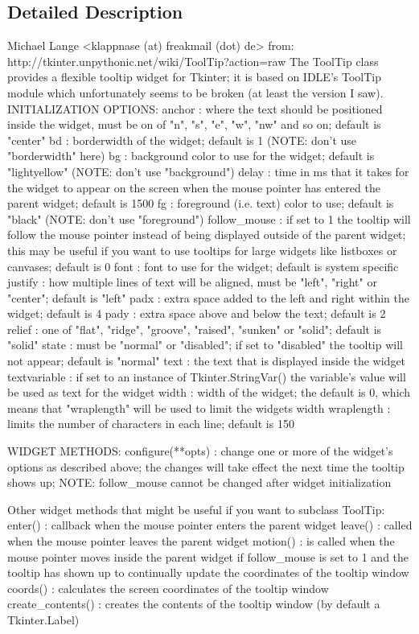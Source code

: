 \subsection{Detailed Description}
\begin{DoxyVerb}Michael Lange <klappnase (at) freakmail (dot) de>
from: http://tkinter.unpythonic.net/wiki/ToolTip?action=raw
The ToolTip class provides a flexible tooltip widget for Tkinter; it is based on IDLE's ToolTip
module which unfortunately seems to be broken (at least the version I saw).
INITIALIZATION OPTIONS:
anchor :        where the text should be positioned inside the widget, must be on of "n", "s", "e", "w", "nw" and so on;
default is "center"
bd :            borderwidth of the widget; default is 1 (NOTE: don't use "borderwidth" here)
bg :            background color to use for the widget; default is "lightyellow" (NOTE: don't use "background")
delay :         time in ms that it takes for the widget to appear on the screen when the mouse pointer has
entered the parent widget; default is 1500
fg :            foreground (i.e. text) color to use; default is "black" (NOTE: don't use "foreground")
follow_mouse :  if set to 1 the tooltip will follow the mouse pointer instead of being displayed
outside of the parent widget; this may be useful if you want to use tooltips for
large widgets like listboxes or canvases; default is 0
font :          font to use for the widget; default is system specific
justify :       how multiple lines of text will be aligned, must be "left", "right" or "center"; default is "left"
padx :          extra space added to the left and right within the widget; default is 4
pady :          extra space above and below the text; default is 2
relief :        one of "flat", "ridge", "groove", "raised", "sunken" or "solid"; default is "solid"
state :         must be "normal" or "disabled"; if set to "disabled" the tooltip will not appear; default is "normal"
text :          the text that is displayed inside the widget
textvariable :  if set to an instance of Tkinter.StringVar() the variable's value will be used as text for the widget
width :         width of the widget; the default is 0, which means that "wraplength" will be used to limit the widgets width
wraplength :    limits the number of characters in each line; default is 150

WIDGET METHODS:
configure(**opts) : change one or more of the widget's options as described above; the changes will take effect the
    next time the tooltip shows up; NOTE: follow_mouse cannot be changed after widget initialization

Other widget methods that might be useful if you want to subclass ToolTip:
enter() :           callback when the mouse pointer enters the parent widget
leave() :           called when the mouse pointer leaves the parent widget
motion() :          is called when the mouse pointer moves inside the parent widget if follow_mouse is set to 1 and the
    tooltip has shown up to continually update the coordinates of the tooltip window
coords() :          calculates the screen coordinates of the tooltip window
create_contents() : creates the contents of the tooltip window (by default a Tkinter.Label)
\end{DoxyVerb}
 